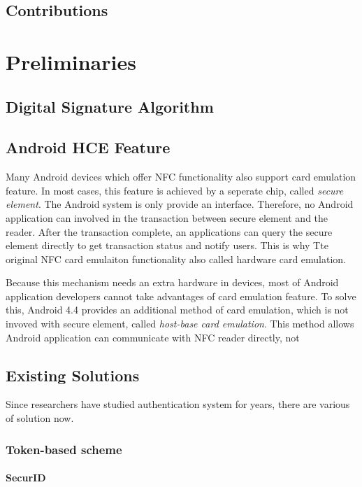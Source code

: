 \begin{CJK}{Bg5}{bsmi}
\section{Contributions}

\chapter{Preliminaries}

\section{Digital Signature Algorithm}

\section{Android HCE Feature}

Many Android devices which offer NFC functionality also support card emulation feature. In most cases, this feature is achieved by a seperate chip, called \emph{secure element}. The Android system is only provide an interface. Therefore, no Android application can involved in the transaction between secure element and the reader. After the transaction complete, an applications can query the secure element directly to get transaction status and notify users. This is why Tte original NFC card emulaiton functionality also called hardware card emulation.

Because this mechanism needs an extra hardware in devices, most of Android application developers cannot take advantages of card emulation feature. To solve this, Android 4.4 provides an additional method of card emulation, which is not invoved with secure element, called \emph{host-base card emulation}. This method allows Android application can communicate with NFC reader directly, not 

\section{Existing Solutions}

Since researchers have studied authentication system for years, there are various of solution now. 

\subsection{Token-based scheme}

\subsubsection{SecurID}


\end{CJK}
